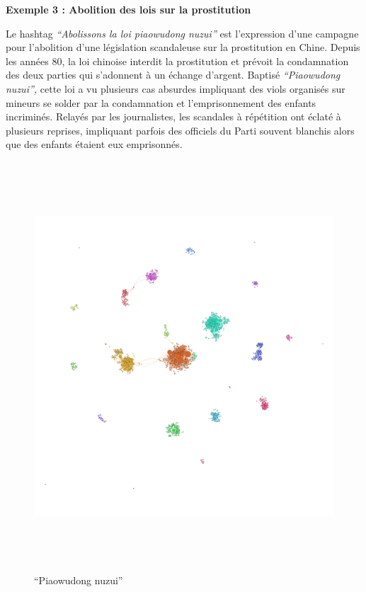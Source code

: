 \clearpage
\textbf{Exemple 3 : Abolition des lois sur la prostitution}

Le hashtag \textit{{\textquotedblleft}Abolissons la loi piaowudong nuzui{\textquotedblright} }est l{\textquoteright}expression d{\textquoteright}une campagne pour l{\textquoteright}abolition d{\textquoteright}une législation scandaleuse sur la prostitution en Chine. Depuis les années 80, la loi chinoise interdit la prostitution et prévoit la condamnation des deux parties qui s{\textquoteright}adonnent à un échange d{\textquoteright}argent. Baptisé \textit{{\textquotedblleft}Piaowudong nuzui{\textquotedblright}, }cette loi a vu plusieurs cas absurdes impliquant des viols organisés sur mineurs se solder par la condamnation et l{\textquoteright}emprisonnement des enfants incriminés. Relayés par les journalistes, les scandales à répétition ont éclaté à plusieurs reprises, impliquant parfois des officiels du Parti souvent blanchis alors que des enfants étaient eux emprisonnés. 

\begin{figure}[th]
    \centering
    \includegraphics[width=6.0114in,height=6.0114in]{figures/chap3/chapitre3-img19.png}
    \caption{ {\textquotedblleft}Piaowudong nuzui{\textquotedblright}}
    \label{fig:piaodong}
\end{figure}

